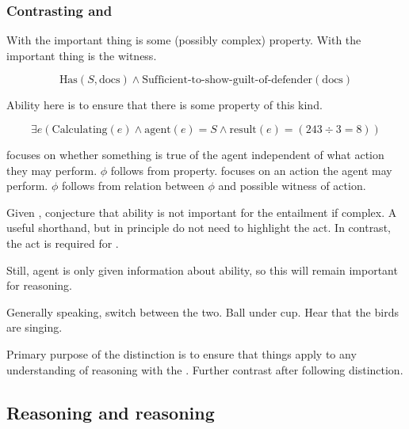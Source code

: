 \subsubsection{Contrasting \AR{} and \WR{}}
\label{sec:contrasting-ar-wr}

\begin{note}[Difference]
  With \AR{} the important thing is some (possibly complex) property.
  With \WR{} the important thing is the witness.

  \[\text{Has}(S,\text{docs}) \land \text{Sufficient-to-show-guilt-of-defender}(\text{docs})\]

  Ability here is to ensure that there is some property of this kind.

  \[\exists e(\text{Calculating}(e) \land \text{agent}(e) = S \land \text{result}(e) = (243 \div 3 = 8))\]


  \AR{} focuses on whether something is true of the agent independent of what action they may perform.
  \(\phi\) follows from property.
  \WR{} focuses on an action the agent may perform.
  \(\phi\) follows from relation between \(\phi\) and possible witness of action.
\end{note}

\begin{note}
  Given \AR{}, conjecture that ability is not important for the entailment if complex.
  A useful shorthand, but in principle do not need to highlight the act.
  In contrast, the act is required for \WR{}.

  Still, agent is only given information about ability, so this will remain important for reasoning.
\end{note}

\begin{note}
  Generally speaking, switch between the two.
  Ball under cup.
  Hear that the birds are singing.
\end{note}

\begin{note}
  Primary purpose of the distinction is to ensure that things apply to any understanding of reasoning with the \aben{}.
  Further contrast after following distinction.
\end{note}

\subsection{Reasoning \nr{} and reasoning \ur{}}
\label{sec:reas-dd-reas}



